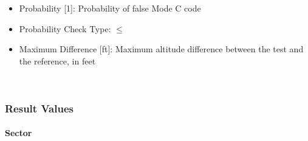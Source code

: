 \begin{itemize}  
\item Probability [1]: Probability of false Mode C code
\item Probability Check Type: $\leq$
\item Maximum Difference [ft]: Maximum altitude difference between the test and the reference, in feet
\end{itemize}
\ \\

\subsubsection{Result Values}

\paragraph{Sector}

